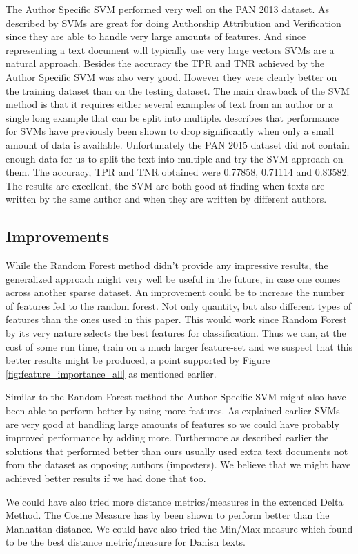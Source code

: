 The Author Specific SVM performed very well on the PAN 2013 dataset. As
described by \cite{stamatos2009} \gls{SVM}s are great for doing Authorship
Attribution and Verification since they are able to handle very large amounts of
features. And since representing a text document will typically use very large
vectors \gls{SVM}s are a natural approach. Besides the accuracy the \gls{TPR}
and \gls{TNR} achieved by the Author Specific SVM was also very good. However
they were clearly better on the training dataset than on the testing dataset.
The main drawback of the SVM method is that it requires either several examples
of text from an author or a single long example that can be split into multiple.
\cite{stamatos2009} describes that performance for \gls{SVM}s have previously
been shown to drop significantly when only a small amount of data is available.
Unfortunately the PAN 2015 dataset did not contain enough data for us to split
the text into multiple and try the SVM approach on them. The accuracy, \gls{TPR}
and \gls{TNR} obtained were 0.77858, 0.71114 and 0.83582. The results are
excellent, the \gls{SVM} are both good at finding when texts are written by the
same author and when they are written by different authors.

\subsection{Improvements}

While the Random Forest method didn't provide any impressive results, the
generalized approach might very well be useful in the future, in case one comes
across another sparse dataset. An improvement could be to increase the number
of features fed to the random forest. Not only quantity, but also different
types of features than the ones used in this paper. This would work since Random
Forest by its very nature selects the best features for classification. Thus we
can, at the cost of some run time, train on a much larger feature-set and we
suspect that this better results might be produced, a point supported by Figure
\ref{fig:feature_importance_all} as mentioned earlier.

Similar to the Random Forest method the Author Specific SVM might also have been
able to perform better by using more features. As explained earlier \gls{SVM}s
are very good at handling large amounts of features so we could have probably
improved performance by adding more. Furthermore as described earlier the
solutions that performed better than ours usually used extra text documents not
from the dataset as opposing authors (imposters). We believe that we might have
achieved better results if we had done that too.

We could have also tried more distance metrics/measures in the extended Delta
Method. The Cosine Measure has by \cite{evert2015towards} been shown to perform
better than the Manhattan distance. We could have also tried the Min/Max measure
which \cite{aalykke2016} found to be the best distance metric/measure for Danish
texts.
